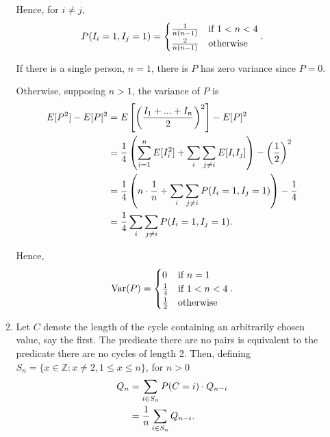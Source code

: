 \documentclass{article}
\DeclareMathOperator{\Var}{Var}
\begin{document}
\begin{enumerate}
\begin{enumerate}
        Hence, for $i \neq j$,
        \[ P(I_i=1,I_j=1) =
                \begin{cases}
                    \frac{1}{n(n-1)} & \text{if } 1<n<4 \\
                    \frac{2}{n(n-1)} & \text{otherwise}
                \end{cases} \text.
        \]

        If there is a single person, $n=1$, there is $P$ has zero variance since $P=0$.

        Otherwise, supposing $n>1$, the variance of $P$ is
        \[\begin{split}
        E[P^2] - E[P]^2 & = E\left[\left(\frac{I_1 + ... + I_n}{2}\right)^2\right] - E[P]^2 \\
                        & = \frac{1}{4}\left( \sum_{i=1}^n E[I_i^2] + \sum_i\sum_{j \neq i}E[I_iI_j] \right) - \left(\frac{1}{2}\right)^2 \\
                        & = \frac{1}{4}\left( n\cdot\frac{1}{n} + \sum_i\sum_{j \neq i}P(I_i=1,I_j=1) \right) - \frac{1}{4} \\
                        & = \frac{1}{4}\sum_i\sum_{j \neq i}P(I_i=1,I_j=1) \text.
        \end{split}\]

        Hence,
        \[ \Var(P) =
                \begin{cases}
                    0 & \text{if } n=1 \\
                    \frac{1}{4} & \text{if } 1 < n < 4 \\
                    \frac{1}{2} & \text{otherwise}
                \end{cases} \text.
        \]
    \item
        Let $C$ denote the length of the cycle containing an arbitrarily chosen value, say the first.
        The predicate there are no pairs is equivalent to the predicate there are no cycles of length 2. Then,
        defining $S_n = \{ x \in \mathbb{Z} : x \neq 2, 1 \leq x \leq n \}$, for $n>0$
        \[\begin{split}
        Q_n & = \sum_{i \in S_n} P(C=i)\cdot Q_{n-i} \\
            & = \frac{1}{n} \sum_{i \in S_n} Q_{n-i} \text. \\
        \end{split}\]


\end{enumerate}
\end{enumerate}
\end{document}
